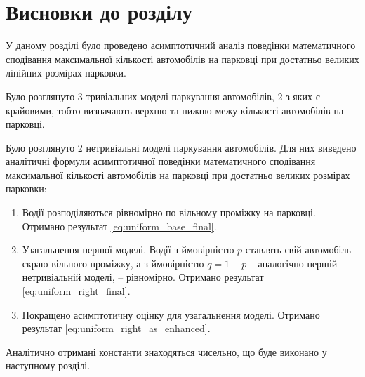 \section{Висновки до розділу}
У даному розділі було проведено асимптотичний аналіз поведінки математичного сподівання максимальної кількості автомобілів на парковці при достатньо великих лінійних розмірах парковки.

Було розглянуто 3 тривіальних моделі паркування автомобілів, 2 з яких є крайовими, тобто визначають верхню та нижню межу кількості автомобілів на парковці.

Було розглянуто 2 нетривіальні моделі паркування автомобілів. Для них виведено аналітичні формули асимптотичної поведінки математичного сподівання максимальної кількості автомобілів на парковці при достатньо великих розмірах парковки:
\begin{enumerate}
\item Водії розподіляються рівномірно по вільному проміжку на парковці. Отримано результат \eqref{eq:uniform_base_final}.
\item Узагальнення першої моделі. Водії з ймовірністю $p$ ставлять свій автомобіль скраю вільного проміжку, а з ймовірністю $q = 1 - p$ – аналогічно першій нетривіальній моделі, – рівномірно. Отримано результат \eqref{eq:uniform_right_final}.
\item Покращено асимптотичну оцінку для узагальнення моделі. Отримано результат \eqref{eq:uniform_right_as_enhanced}.
\end{enumerate}

Аналітично отримані константи знаходяться чисельно, що буде виконано у наступному розділі.
